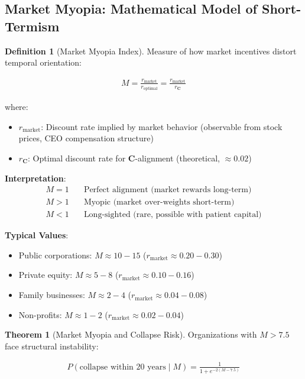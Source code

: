 \documentclass[11pt,a4paper]{article}
\theoremstyle{definition}
\newtheorem{definition}{Definition}[section]
\newtheorem{theorem}{Theorem}[section]
\theoremstyle{remark}
\begin{document}
\begin{small}
\begin{enumerate}
\subsection{Market Myopia: Mathematical Model of Short-Termism}

\begin{definition}[Market Myopia Index]
Measure of how market incentives distort temporal orientation:

\begin{align}
M = \frac{r_{\text{market}}}{r_{\text{optimal}}} = \frac{r_{\text{market}}}{r_{\mathbf{C}}}
\end{align}

where:
\begin{itemize}
    \item \(r_{\text{market}}\): Discount rate implied by market behavior (observable from stock prices, CEO compensation structure)
    \item \(r_{\mathbf{C}}\): Optimal discount rate for \(\mathbf{C}\)-alignment (theoretical, \(\approx 0.02\))
\end{itemize}

\textbf{Interpretation}:
\begin{align}
M = 1 &\quad \text{Perfect alignment (market rewards long-term)} \\
M > 1 &\quad \text{Myopic (market over-weights short-term)} \\
M < 1 &\quad \text{Long-sighted (rare, possible with patient capital)}
\end{align}

\textbf{Typical Values}:
\begin{itemize}
    \item Public corporations: \(M \approx 10-15\) (\(r_{\text{market}} \approx 0.20-0.30\))
    \item Private equity: \(M \approx 5-8\) (\(r_{\text{market}} \approx 0.10-0.16\))
    \item Family businesses: \(M \approx 2-4\) (\(r_{\text{market}} \approx 0.04-0.08\))
    \item Non-profits: \(M \approx 1-2\) (\(r_{\text{market}} \approx 0.02-0.04\))
\end{itemize}
\end{definition}

\begin{theorem}[Market Myopia and Collapse Risk]
Organizations with \(M > 7.5\) face structural instability:

\begin{align}
P(\text{collapse within 20 years} \mid M) = \frac{1}{1 + e^{-2(M - 7.5)}}
\end{align}


\end{theorem}
\end{enumerate}
\end{small}
\end{document}
